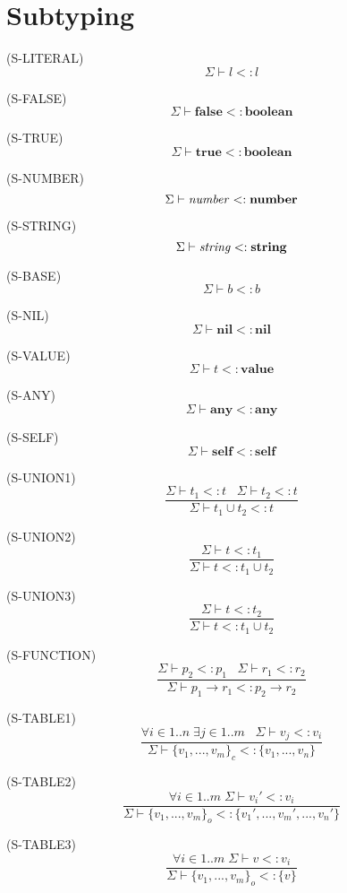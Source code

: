 \documentclass{paper}
\newcommand{\Value}{\mathbf{value}}
\newcommand{\Any}{\mathbf{any}}
\newcommand{\Nil}{\mathbf{nil}}
\newcommand{\Self}{\mathbf{self}}
\newcommand{\False}{\mathbf{false}}
\newcommand{\True}{\mathbf{true}}
\newcommand{\Boolean}{\mathbf{boolean}}
\newcommand{\Number}{\mathbf{number}}
\newcommand{\String}{\mathbf{string}}
\newcommand{\mylabel}[1]{\; (\textsc{#1})}
\newcommand{\senv}{\Sigma}
\newcommand{\subtype}{<:}
\begin{document}
\section{Subtyping}

\noindent

\mylabel{S-LITERAL}
\[
\senv \vdash l \subtype l
\]

\mylabel{S-FALSE}
\[
\senv \vdash \False \subtype \Boolean
\]

\mylabel{S-TRUE}
\[
\senv \vdash \True \subtype \Boolean
\]

\mylabel{S-NUMBER}
\[
\senv \vdash {\it number} \subtype \Number
\]

\mylabel{S-STRING}
\[
\senv \vdash {\it string} \subtype \String
\]

\mylabel{S-BASE}
\[
\senv \vdash b \subtype b
\]

\mylabel{S-NIL}
\[
\senv \vdash \Nil \subtype \Nil
\]

\mylabel{S-VALUE}
\[
\senv \vdash t \subtype \Value
\]

\mylabel{S-ANY}
\[
\senv \vdash \Any \subtype \Any
\]

\mylabel{S-SELF}
\[
\senv \vdash \Self \subtype \Self
\]

\mylabel{S-UNION1}
\[
\dfrac{\senv \vdash t_{1} \subtype t \;\;\;
       \senv \vdash t_{2} \subtype t}
      {\senv \vdash t_{1} \cup t_{2} \subtype t}
\]

\mylabel{S-UNION2}
\[
\dfrac{\senv \vdash t \subtype t_{1}}
      {\senv \vdash t \subtype t_{1} \cup t_{2}}
\]

\mylabel{S-UNION3}
\[
\dfrac{\senv \vdash t \subtype t_{2}}
      {\senv \vdash t \subtype t_{1} \cup t_{2}}
\]

\mylabel{S-FUNCTION}
\[
\dfrac{\senv \vdash p_{2} \subtype p_{1} \;\;\;
       \senv \vdash r_{1} \subtype r_{2}}
      {\senv \vdash p_{1} \rightarrow r_{1} \subtype p_{2} \rightarrow r_{2}}
\]

\mylabel{S-TABLE1}
\[
\dfrac{\forall i \in 1..n \; \exists j \in 1..m \;\;\;
       \senv \vdash v_{j} \subtype v_{i}}
      {\senv \vdash \{v_{1}, ..., v_{m}\}_{c} \subtype \{v_{1}, ..., v_{n}\}}
\]

\mylabel{S-TABLE2}
\[
\dfrac{\forall i \in 1..m \; \senv \vdash v_{i}' \subtype v_{i}}
      {\senv \vdash \{v_{1}, ..., v_{m}\}_{o} \subtype \{v_{1}', ..., v_{m}', ..., v_{n}'\}}
\]

\mylabel{S-TABLE3}
\[
\dfrac{\forall i \in 1..m \; \senv \vdash v \subtype v_{i}}
      {\senv \vdash \{v_{1}, ..., v_{m}\}_{o} \subtype \{v\}} 
\]
\end{document}
